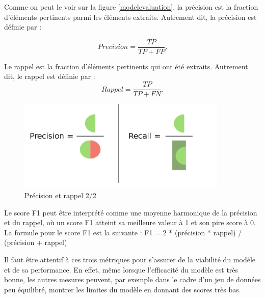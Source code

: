 Comme on peut le voir sur la figure \ref{modelevaluation}, la précision est la fraction d'éléments pertinents parmi les éléments extraits. Autrement dit, la précision est définie par : 

\begin{equation}
Precision = \frac{TP}{TP + FP}.
\end{equation}
 

Le rappel est la fraction d'éléments pertinents qui ont été extraits. Autrement dit, le rappel est définie par :
\begin{equation}
Rappel = \frac{TP}{TP + FN}.
\end{equation} 

\bigskip
\begin{figure}[!ht]
    \centering
    \includegraphics[width=10cm]{img/07_preci_recall.png}
    \caption[Précision et rappel 2/2]{Précision et rappel 2/2\footnotemark}
    \label{preci_recall}
\end{figure}


Le score F1 peut être interprété comme une moyenne harmonique de la précision et du rappel, où un score F1 atteint sa meilleure valeur à 1 et son pire score à 0. La formule pour le score F1 est la suivante : F1 = 2 * (précision * rappel) / (précision + rappel)

Il faut être attentif à ces trois métriques pour s'assurer de la viabilité du modèle et de sa performance. En effet, même lorsque l'efficacité du modèle est très bonne, les autres mesures peuvent, par exemple dans le cadre d'un jeu de données peu équilibré, montrer les limites du modèle en donnant des scores très bas.